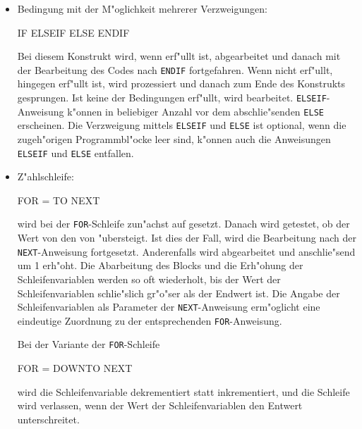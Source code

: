 \begin{itemize}
\item Bedingung mit der M"oglichkeit mehrerer Verzweigungen:
\begin{verbatimcmd}
IF 
ELSEIF 
ELSE
ENDIF
\end{verbatimcmd}
Bei diesem Konstrukt wird, wenn  erf"ullt ist,
 abgearbeitet und danach mit der Bearbeitung des
Codes nach \verb|ENDIF| fortgefahren. Wenn 
nicht erf"ullt,  hingegen erf"ullt ist, wird
 prozessiert und danach zum Ende des Konstrukts
gesprungen. Ist keine der Bedingungen erf"ullt, wird 
bearbeitet. \verb|ELSEIF|-Anweisung k"onnen in beliebiger Anzahl vor
dem abschlie"senden \verb|ELSE| erscheinen. Die Verzweigung mittels
\verb|ELSEIF| und \verb|ELSE| ist optional, wenn die zugeh"origen
Programmbl"ocke leer sind, k"onnen auch die Anweisungen \verb|ELSEIF|
und \verb|ELSE| entfallen.

\item Z"ahlschleife:
\begin{verbatimcmd}
FOR  =  TO 
NEXT 
\end{verbatimcmd}
 wird bei der \verb|FOR|-Schleife
zun"achst auf  gesetzt. Danach wird
getestet, ob der Wert von  den von 
"ubersteigt. Ist dies der Fall, wird die Bearbeitung nach
der \verb|NEXT|-Anweisung fortgesetzt. Anderenfalls wird
 abgearbeitet und anschlie"send
 um 1 erh"oht. Die Abarbeitung des
Blocks und die Erh"ohung der Schleifenvariablen werden so oft wiederholt,
bis der Wert der Schleifenvariablen schlie"slich gr"o"ser als der
Endwert ist. Die Angabe der Schleifenvariablen als Parameter der
\verb|NEXT|-Anweisung erm"oglicht eine eindeutige Zuordnung zu
der entsprechenden \verb|FOR|-Anweisung.

Bei der Variante der \verb|FOR|-Schleife 
\begin{verbatimcmd}
FOR  =  DOWNTO 
NEXT 
\end{verbatimcmd}
wird die Schleifenvariable dekrementiert statt inkrementiert, und die
Schleife wird verlassen, wenn der Wert der Schleifenvariablen den
Entwert unterschreitet.


\end{itemize}
